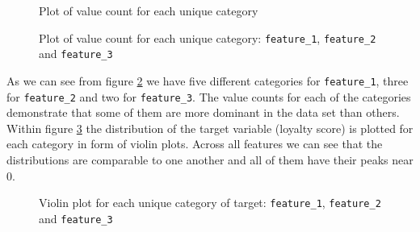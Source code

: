 \documentclass{article}
\begin{document}
\begin{figure}[h]
  \centering
  
  \caption{Plot of value count for each unique category}
  \label{fig:catplot_first_active_month}
\end{figure}

\newpage
\begin{figure}[h]
     \centering
     \begin{subfigure}[b]{0.4\textwidth}
         \centering
         
     \end{subfigure}
     \hfill
     \begin{subfigure}[b]{0.25\textwidth}
         \centering
         
     \end{subfigure}
     \hfill
     \begin{subfigure}[b]{0.2\textwidth}
         \centering
         
     \end{subfigure}
     
    \caption{Plot of value count for each unique category: \texttt{feature\_1}, \texttt{feature\_2} and \texttt{feature\_3}}
    \label{fig:catplot_features}
\end{figure}

As we can see from figure \ref{fig:catplot_features} we have five different categories for \texttt{feature\_1}, three for \texttt{feature\_2} and two for \texttt{feature\_3}. The value counts for each of the categories demonstrate that some of them are more dominant in the data set than others. Within figure \ref{fig:violin_plot_features} the distribution of the target variable (loyalty score) is plotted for each category in form of violin plots. Across all features we can see that the distributions are comparable to one another and all of them have their peaks near 0. 

\begin{figure}[h]
     \centering
     \begin{subfigure}[b]{1\textwidth}
         \centering
         
     \end{subfigure}
     \hfill
     \begin{subfigure}[b]{0.4\textwidth}
         \centering
         
     \end{subfigure}
     \hfill
     \begin{subfigure}[b]{0.5\textwidth}
         \centering
         
     \end{subfigure}
     
    \caption{Violin plot for each unique category of target: \texttt{feature\_1}, \texttt{feature\_2} and \texttt{feature\_3}}
    \label{fig:violin_plot_features}
\end{figure}
\end{document}

